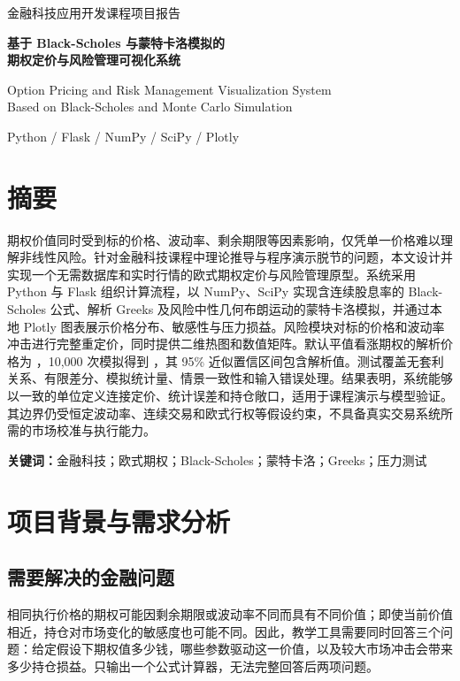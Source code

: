 \documentclass[UTF8,a4paper,12pt]{ctexart}
\begin{document}
\begin{center}
{\small\color{brand}金融科技应用开发课程项目报告}\par\vspace{1cm}
{\LARGE\bfseries 基于 Black-Scholes 与蒙特卡洛模拟的\\[0.4em]期权定价与风险管理可视化系统}\par\vspace{.65cm}
{\small Option Pricing and Risk Management Visualization System\\
Based on Black-Scholes and Monte Carlo Simulation}\par\vspace{.7cm}
{\large Python / Flask / NumPy / SciPy / Plotly}\par\vspace{.8cm}
\end{center}
\section*{摘要}
期权价值同时受到标的价格、波动率、剩余期限等因素影响，仅凭单一价格难以理解非线性风险。针对金融科技课程中理论推导与程序演示脱节的问题，本文设计并实现一个无需数据库和实时行情的欧式期权定价与风险管理原型。系统采用 Python 与 Flask 组织计算流程，以 NumPy、SciPy 实现含连续股息率的 Black-Scholes 公式、解析 Greeks 及风险中性几何布朗运动的蒙特卡洛模拟，并通过本地 Plotly 图表展示价格分布、敏感性与压力损益。风险模块对标的价格和波动率冲击进行完整重定价，同时提供二维热图和数值矩阵。默认平值看涨期权的解析价格为 \BSPrice，10,000 次模拟得到 \MCPrice，其 95\% 近似置信区间包含解析值。测试覆盖无套利关系、有限差分、模拟统计量、情景一致性和输入错误处理。结果表明，系统能够以一致的单位定义连接定价、统计误差和持仓敞口，适用于课程演示与模型验证。其边界仍受恒定波动率、连续交易和欧式行权等假设约束，不具备真实交易系统所需的市场校准与执行能力。

\noindent\textbf{关键词：}金融科技；欧式期权；Black-Scholes；蒙特卡洛；Greeks；压力测试

\vfill
{}
\newpage
\tableofcontents
\newpage

\section{项目背景与需求分析}
\subsection{需要解决的金融问题}
相同执行价格的期权可能因剩余期限或波动率不同而具有不同价值；即使当前价值相近，持仓对市场变化的敏感度也可能不同。因此，教学工具需要同时回答三个问题：给定假设下期权值多少钱，哪些参数驱动这一价值，以及较大市场冲击会带来多少持仓损益。只输出一个公式计算器，无法完整回答后两项问题。
\end{document}
